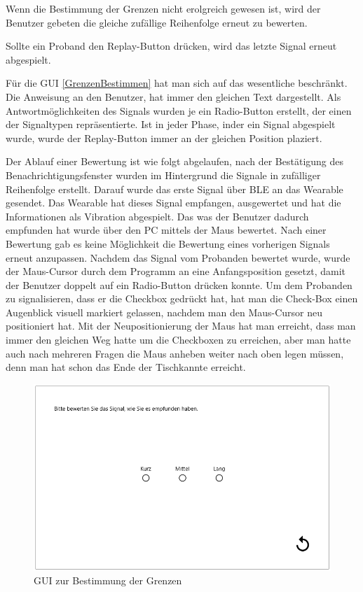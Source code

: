 Wenn die Bestimmung der Grenzen nicht erolgreich gewesen ist, wird der Benutzer gebeten die gleiche zuf{\"a}llige Reihenfolge erneut zu bewerten. 

Sollte ein Proband den Replay-Button dr{\"u}cken, wird das letzte Signal erneut abgespielt.

F{\"u}r die GUI \autoref{GrenzenBestimmen} hat man sich auf das wesentliche beschr{\"a}nkt. Die Anweisung an den Benutzer, hat immer den gleichen Text dargestellt. Als Antwortm{\"o}glichkeiten des Signals wurden je ein Radio-Button erstellt, der einen der Signaltypen repr{\"a}sentierte. Ist in jeder Phase, inder ein Signal abgespielt wurde, wurde der Replay-Button immer an der gleichen Position plaziert. 

Der Ablauf einer Bewertung ist wie folgt abgelaufen, nach der Best{\"a}tigung des Benachrichtigungsfenster wurden im Hintergrund die Signale in zuf{\"a}lliger Reihenfolge erstellt. Darauf wurde das erste Signal {\"u}ber BLE an das Wearable gesendet. Das Wearable hat dieses Signal empfangen, ausgewertet und hat die Informationen als Vibration abgespielt. Das was der Benutzer dadurch empfunden hat wurde {\"u}ber den PC mittels der Maus bewertet. Nach einer Bewertung gab es keine M{\"o}glichkeit die Bewertung eines vorherigen Signals erneut anzupassen. Nachdem das Signal vom Probanden bewertet wurde, wurde der Maus-Cursor durch dem Programm an eine Anfangsposition gesetzt, damit der Benutzer doppelt auf ein Radio-Button dr{\"u}cken konnte. Um dem Probanden zu signalisieren, dass er die Checkbox gedr{\"u}ckt hat, hat man die Check-Box einen Augenblick visuell markiert gelassen, nachdem man den Maus-Cursor neu positioniert hat. Mit der Neupositionierung der Maus hat man erreicht, dass man immer den gleichen Weg hatte um die Checkboxen zu erreichen, aber man hatte auch nach mehreren Fragen die Maus anheben weiter nach oben legen m{\"u}ssen, denn man hat schon das Ende der Tischkannte erreicht.

\begin{figure}
	\centering
    \includegraphics[width=\textwidth]{pics/gui/GrenzenBestimmen.png}
    \caption{GUI zur Bestimmung der Grenzen}
    \label{fig:GrenzenBestimmen}
\end{figure}

